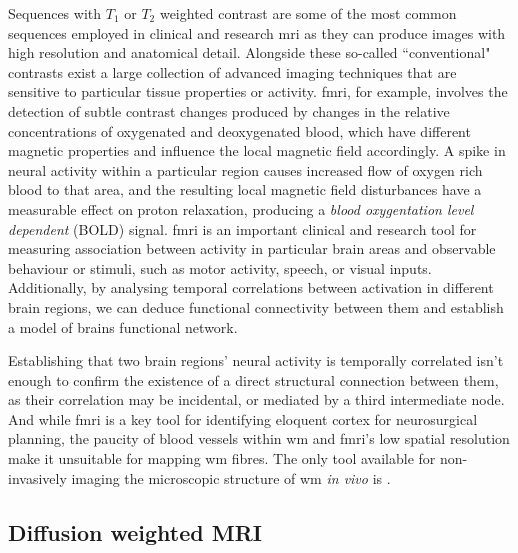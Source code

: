 Sequences with $T_1$ or $T_2$ weighted contrast are some of the most common sequences employed in clinical and research \gls{mri} as they can produce images with high resolution and anatomical detail.
Alongside these so-called ``conventional" contrasts exist a large collection of advanced imaging techniques that are sensitive to particular tissue properties or activity.
\Gls{fmri}, for example, involves the detection of subtle contrast changes produced by changes in the relative concentrations of oxygenated and deoxygenated blood, which have different magnetic properties and influence the local magnetic field accordingly.
A spike in neural activity within a particular region causes increased flow of oxygen rich blood to that area, and the resulting local magnetic field disturbances have a measurable effect on proton relaxation, producing a \textit{blood oxygentation level dependent} (BOLD) signal.
\gls{fmri} is an important clinical and research tool for measuring association between activity in particular brain areas and observable behaviour or stimuli, such as motor activity, speech, or visual inputs.
Additionally, by analysing temporal correlations between activation in different brain regions, we can deduce functional connectivity between them and establish a model of brains functional network.

Establishing that two brain regions' neural activity is temporally correlated isn't enough to confirm the existence of a direct structural connection between them, as their correlation may be incidental, or mediated by a third intermediate node.
And while \gls{fmri} is a key tool for identifying eloquent cortex for neurosurgical planning, the paucity of blood vessels within \gls{wm} and \gls{fmri}'s low spatial resolution make it unsuitable for mapping \gls{wm} fibres.
The only tool available for non-invasively imaging the microscopic structure of \gls{wm} \textit{in vivo} is .

\subsection{Diffusion weighted MRI}


